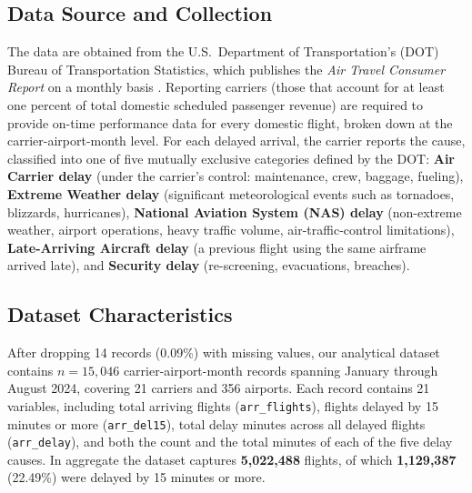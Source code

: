 \documentclass[12pt,letterpaper]{article}
\begin{document}
\subsection{Data Source and Collection}
The data are obtained from the U.S.\ Department of Transportation's
(DOT) Bureau of Transportation Statistics, which publishes the
\emph{Air Travel Consumer Report} on a monthly basis \citep{bts2024}.
Reporting carriers (those that account for at least one percent of
total domestic scheduled passenger revenue) are required to provide
on-time performance data for every domestic flight, broken down at the
carrier-airport-month level. For each delayed arrival, the carrier
reports the cause, classified into one of five mutually exclusive
categories defined by the DOT: \textbf{Air Carrier delay} (under the
carrier's control: maintenance, crew, baggage, fueling), \textbf{Extreme
Weather delay} (significant meteorological events such as tornadoes,
blizzards, hurricanes), \textbf{National Aviation System (NAS) delay}
(non-extreme weather, airport operations, heavy traffic volume,
air-traffic-control limitations), \textbf{Late-Arriving Aircraft delay}
(a previous flight using the same airframe arrived late), and
\textbf{Security delay} (re-screening, evacuations, breaches).

\subsection{Dataset Characteristics}
After dropping 14 records (0.09\%) with missing values, our analytical
dataset contains $n = 15{,}046$ carrier-airport-month records spanning
January through August 2024, covering 21 carriers and 356 airports. Each
record contains 21 variables, including total arriving flights
(\texttt{arr\_flights}), flights delayed by 15 minutes or more
(\texttt{arr\_del15}), total delay minutes across all delayed flights
(\texttt{arr\_delay}), and both the count and the total minutes of each
of the five delay causes. In aggregate the dataset captures
\textbf{5{,}022{,}488} flights, of which \textbf{1{,}129{,}387}
(22.49\%) were delayed by 15 minutes or more.
\end{document}
